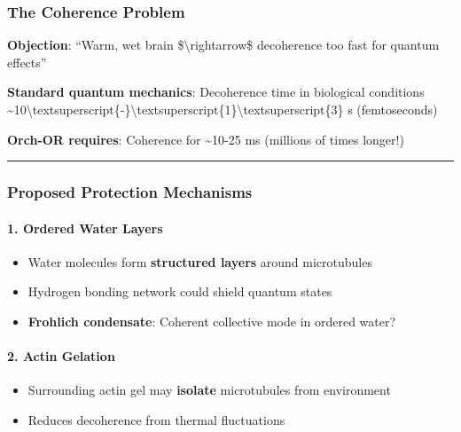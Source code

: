 \subsubsection{The Coherence Problem}\label{the-coherence-problem}

\textbf{Objection}: ``Warm, wet brain \$\textbackslash rightarrow\$
decoherence too fast for quantum effects''

\textbf{Standard quantum mechanics}: Decoherence time in biological
conditions
\textasciitilde10\textbackslash textsuperscript\{-\}\textbackslash textsuperscript\{1\}\textbackslash textsuperscript\{3\}
s (femtoseconds)

\textbf{Orch-OR requires}: Coherence for \textasciitilde10-25 ms
(millions of times longer!)

\begin{center}\rule{0.5\linewidth}{0.5pt}\end{center}

\subsubsection{Proposed Protection
Mechanisms}\label{proposed-protection-mechanisms}

\paragraph{1. Ordered Water Layers}\label{ordered-water-layers}

\begin{itemize}
\tightlist
\item
  Water molecules form \textbf{structured layers} around microtubules
\item
  Hydrogen bonding network could shield quantum states
\item
  \textbf{Frohlich condensate}: Coherent collective mode in ordered
  water?
\end{itemize}

\paragraph{2. Actin Gelation}\label{actin-gelation}

\begin{itemize}
\tightlist
\item
  Surrounding actin gel may \textbf{isolate} microtubules from
  environment
\item
  Reduces decoherence from thermal fluctuations
\end{itemize}

